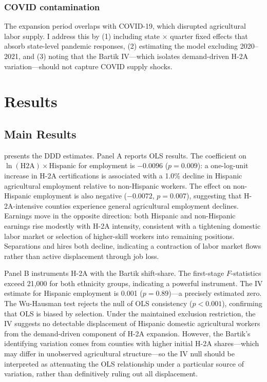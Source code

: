 \documentclass[12pt]{article}
\begin{document}
\subsubsection*{COVID contamination} The expansion period overlaps with COVID-19, which disrupted agricultural labor supply. I address this by (1) including state $\times$ quarter fixed effects that absorb state-level pandemic responses, (2) estimating the model excluding 2020--2021, and (3) noting that the Bartik IV---which isolates demand-driven H-2A variation---should not capture COVID supply shocks.

\section{Results}

\subsection{Main Results}

 presents the DDD estimates. Panel A reports OLS results. The coefficient on $\ln(\text{H2A}) \times \text{Hispanic}$ for employment is $-0.0096$ ($p = 0.009$): a one-log-unit increase in H-2A certifications is associated with a 1.0\% decline in Hispanic agricultural employment relative to non-Hispanic workers. The effect on non-Hispanic employment is also negative ($-0.0072$, $p = 0.007$), suggesting that H-2A-intensive counties experience general agricultural employment declines. Earnings move in the opposite direction: both Hispanic and non-Hispanic earnings rise modestly with H-2A intensity, consistent with a tightening domestic labor market or selection of higher-skill workers into remaining positions. Separations and hires both decline, indicating a contraction of labor market flows rather than active displacement through job loss.

Panel B instruments H-2A with the Bartik shift-share. The first-stage $F$-statistics exceed 21,000 for both ethnicity groups, indicating a powerful instrument. The IV estimate for Hispanic employment is 0.001 ($p = 0.89$)---a precisely estimated zero. The Wu-Hausman test rejects the null of OLS consistency ($p < 0.001$), confirming that OLS is biased by selection. Under the maintained exclusion restriction, the IV suggests no detectable displacement of Hispanic domestic agricultural workers from the demand-driven component of H-2A expansion. However, the Bartik's identifying variation comes from counties with higher initial H-2A shares---which may differ in unobserved agricultural structure---so the IV null should be interpreted as attenuating the OLS relationship under a particular source of variation, rather than definitively ruling out all displacement.
\end{document}
